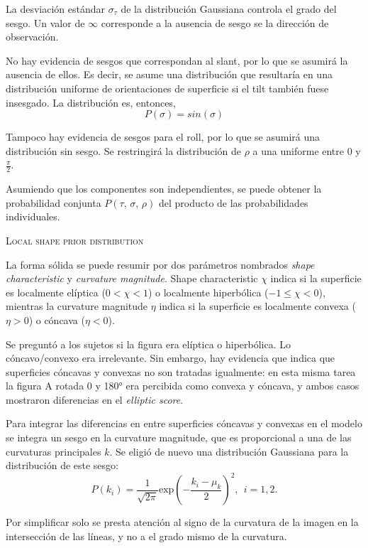 \documentclass[a4paper,12pt]{article}
\begin{document}
La desviación estándar $\sigma_{\tau}$ de la distribución Gaussiana controla el grado del sesgo. Un valor de $\infty$ corresponde a la ausencia de sesgo se la dirección de observación.

No hay evidencia de sesgos que correspondan al slant, por lo que se asumirá la ausencia de ellos. Es decir, se asume una distribución que resultaría en una distribución uniforme de orientaciones de superficie si el tilt también fuese insesgado. La distribución es, entonces,
\begin{equation}
	P(\sigma) = sin(\sigma)
\end{equation}

Tampoco hay evidencia de sesgos para el roll, por lo que se asumirá una distribución sin sesgo. Se restringirá la distribución de $\rho$ a una uniforme entre 0 y $\frac{\pi}{2}$.

Asumiendo que los componentes son independientes, se puede obtener la probabilidad conjunta $P(\tau,\,\sigma,\,\rho)$ del producto de las probabilidades individuales.

{\scshape Local shape prior distribution}

La forma sólida se puede resumir por dos parámetros nombrados {\itshape shape characteristic} y {\itshape curvature magnitude}. Shape characteristic $\chi$ indica si la superficie es localmente elíptica ($0<\chi<1$) o localmente hiperbólica ($-1\leq \chi< 0$), mientras la curvature magnitude $\eta$ indica si la superficie es localmente convexa ($\eta>0$) o cóncava ($\eta<0$).

Se preguntó a los sujetos si la figura era elíptica o hiperbólica. Lo cóncavo/convexo era irrelevante. Sin embargo, hay evidencia que indica que superficies cóncavas y convexas no son tratadas igualmente: en esta misma tarea la figura A rotada 0 y 180° era percibida como convexa y cóncava, y ambos casos mostraron diferencias en el {\itshape elliptic score}.

Para integrar las diferencias en entre superficies cóncavas y convexas en el modelo se integra un sesgo en la curvature magnitude, que es proporcional a una de las curvaturas principales $k$. Se eligió de nuevo una distribución Gaussiana para la distribución de este sesgo:
\begin{equation}
	P(k_{i})
	=
	\frac{
		1
	}{
	\sqrt{2\pi}
	}
	\mbox{exp}
	\left(
		-
		\frac{
		k_{i}-\mu_{k}
		}{
			2
		}
	\right)^{2},\ \ i=1,2.
\end{equation}

Por simplificar solo se presta atención al signo de la curvatura de la imagen en la intersección de las líneas, y no a el grado mismo de la curvatura. 
\end{document}
